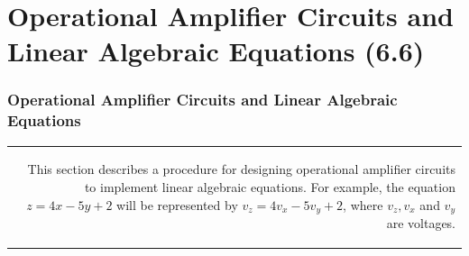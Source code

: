 \documentclass[aspectratio=169]{beamer}
\begin{document}
\section{Operational Amplifier Circuits and Linear Algebraic Equations (6.6)}
\begin{frame}[fragile]
\frametitle{Operational Amplifier Circuits and Linear Algebraic Equations}
\begin{tabular}{r}
	 \begin{columns}
		\begin{column}{1\textwidth}
		This section describes a procedure for designing operational amplifier circuits to implement linear algebraic 
		equations. For example, the equation $z=4x-5y+2$ will be represented by $v_{z}=4v_{x}-5v_{y}+2$, where $v_{z}, v_{x}$  and  $v_{y}$ are voltages.
		\end{column}
	\end{columns}\\


\end{tabular}
\end{frame}
\end{document}
